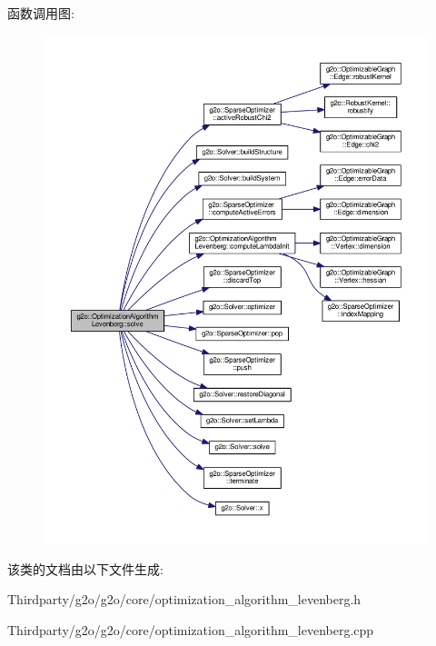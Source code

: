 函数调用图\-:
\nopagebreak
\begin{figure}[H]
\begin{center}
\leavevmode
\includegraphics[width=350pt]{classg2o_1_1OptimizationAlgorithmLevenberg_a7140fa989b54eac4e09ba17829dcada0_cgraph}
\end{center}
\end{figure}




该类的文档由以下文件生成\-:\begin{DoxyCompactItemize}
\item 
Thirdparty/g2o/g2o/core/optimization\-\_\-algorithm\-\_\-levenberg.\-h\item 
Thirdparty/g2o/g2o/core/optimization\-\_\-algorithm\-\_\-levenberg.\-cpp\end{DoxyCompactItemize}
